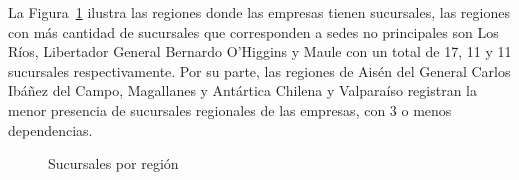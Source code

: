 \documentclass[
  11pt,
]{article}
\begin{document}
La Figura~\ref{fig-mapa-sucursal} ilustra las regiones donde las
empresas tienen sucursales, las regiones con más cantidad de sucursales
que corresponden a sedes no principales son Los Ríos, Libertador General
Bernardo O'Higgins y Maule con un total de 17, 11 y 11 sucursales
respectivamente. Por su parte, las regiones de Aisén del General Carlos
Ibáñez del Campo, Magallanes y Antártica Chilena y Valparaíso registran
la menor presencia de sucursales regionales de las empresas, con 3 o
menos dependencias.

\FloatBarrier

\begin{figure}[H]

\caption{\label{fig-mapa-sucursal}Sucursales por región}


\end{figure}%

\FloatBarrier
\end{document}
